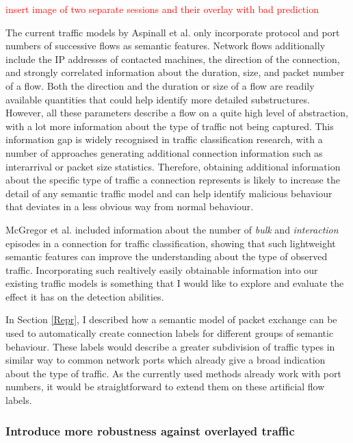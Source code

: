 \documentclass[a4paper,12pt,twoside]{report}
\begin{document}
\textcolor{red}{insert image of two separate sessions and their overlay with bad prediction }

The current traffic models by Aspinall et al. only incorporate protocol and port numbers of successive flows as semantic features. Network flows additionally include the IP addresses of contacted machines, the direction of the connection, and strongly correlated information about the duration, size, and packet number of a flow. Both the direction and the duration or size of a flow are readily available quantities that could help identify more detailed substructures. However, all these parameters describe a flow on a quite high level of abstraction, with a lot more information about the type of traffic not being captured. This information gap is widely recognised in traffic classification research, with a number of approaches generating additional connection information such as interarrival or packet size statistics. Therefore, obtaining additional information about the specific type of traffic a connection represents is likely to increase the detail of any semantic traffic model and can help identify malicious behaviour that deviates in a less obvious way from normal behaviour.

McGregor et al. \cite{mcgregor2004flow} included information about the number of \textit{bulk} and \textit{interaction} episodes in a connection for traffic classification, showing that such lightweight semantic features can improve the understanding about the type of observed traffic. Incorporating such realtively easily obtainable information into our existing traffic models is something that I would like to explore and evaluate the effect it has on the detection abilities. 

In Section \ref{Repr}, I described how a semantic model of packet exchange can be used to automatically create connection labels for different groups of semantic behaviour. These labels would describe a greater subdivision of traffic types in similar way to common network ports which already give a broad indication about the type of traffic. As the currently used methods already work with port numbers, it would be straightforward to extend them on these artificial flow labels.


\subsubsection{Introduce more robustness against overlayed traffic}
\end{document}
